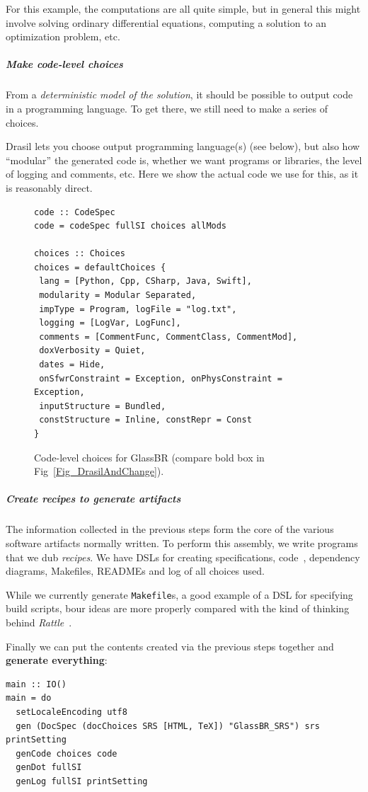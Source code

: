 \documentclass[a4paper,UKenglish,cleveref,autoref,thm-restate]{oasics-v2021}
\begin{document}
For this example, the computations are all quite simple, but in general this
might involve solving ordinary differential equations, computing a solution to
an optimization problem, etc.

\subparagraph*{Make code-level choices}
From a \emph{deterministic model of the solution}, it should be
possible to output code in a programming language. To get there, we still need
to make a series of choices.

Drasil lets you choose output programming language(s) (see below), but also how
``modular'' the generated code is, whether we want programs or libraries, the
level of logging and comments, etc. Here we show the actual code we use for
this, as it is reasonably direct.

\begin{figure}[htb]
\begin{lstlisting}
code :: CodeSpec
code = codeSpec fullSI choices allMods

choices :: Choices
choices = defaultChoices {
 lang = [Python, Cpp, CSharp, Java, Swift], 
 modularity = Modular Separated,
 impType = Program, logFile = "log.txt", 
 logging = [LogVar, LogFunc],
 comments = [CommentFunc, CommentClass, CommentMod], 
 doxVerbosity = Quiet,
 dates = Hide, 
 onSfwrConstraint = Exception, onPhysConstraint = Exception,
 inputStructure = Bundled, 
 constStructure = Inline, constRepr = Const
}
\end{lstlisting}
  \caption{Code-level choices for GlassBR (compare bold box in Fig~\ref{Fig_DrasilAndChange}).}
  \label{fig:CodeChoices}
\end{figure}

\subparagraph*{Create recipes to generate artifacts}
The information collected in the previous steps form the core of the various
software artifacts normally written. To perform this assembly, we write
programs that we dub \emph{recipes}. We have DSLs for creating specifications,
code~\cite{GOOLPEPM}, dependency diagrams, Makefiles, READMEs and log of all choices
used.

While we currently generate \texttt{Makefile}s, a good example of a DSL for
specifying build scripts, bour ideas are more properly compared with
the kind of thinking behind \textit{Rattle}~\cite{mitchell:rattle_18_nov_2020}.

Finally we can put the contents created via the previous steps together and
\textbf{generate everything}:
\begin{lstlisting}
main :: IO()
main = do
  setLocaleEncoding utf8
  gen (DocSpec (docChoices SRS [HTML, TeX]) "GlassBR_SRS") srs printSetting
  genCode choices code
  genDot fullSI
  genLog fullSI printSetting
\end{lstlisting}
\end{document}
